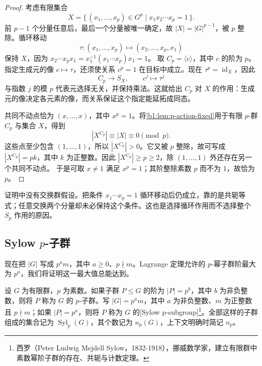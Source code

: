 \begin{proof}
	考虑有限集合
	\[
		X=\bigl\{\,(x_1,\ldots,x_p)\in G^p\mid x_1x_2\cdots x_p=1\,\bigr\}.
	\]
	前 \(p-1\) 个分量任意后，最后一个分量被唯一确定，故 \(|X|=|G|^{p-1}\)，被 \(p\) 整除。循环移动
	\[
		\tau:(x_1,\ldots,x_p)\longmapsto(x_2,\ldots,x_p,x_1)
	\]
	保持 \(X\)，因为 \(x_2\cdots x_px_1=x_1^{-1}(x_1\cdots x_p)x_1=1\)。 取 \(C_p=\langle c\rangle\)，其中 \(c\) 的阶为 \(p\)。指定生成元的像 \(c\mapsto\tau\)，还须使关系 \(c^p=1\) 在目标中成立。现在 \(\tau^p=\operatorname{id}_X\)，因此
	\[
		C_p\longrightarrow S_X,\qquad c^j\longmapsto\tau^j
	\]
	与指数 \(j\) 的模 \(p\) 代表元选择无关，并保持乘法。这就给出 \(C_p\) 对 \(X\) 的作用：生成元的像决定各元素的像，而关系保证这个指定能延拓成同态。

	共同不动点恰为 \((x,\ldots,x)\)，其中 \(x^p=1\)。将\cref{b1:lem:p-action-fixed}用于有限 \(p\)-群 \(C_p\) 与集合 \(X\)，得到
	\[
		|X^{C_p}|\equiv|X|\equiv0\pmod p.
	\]
	这些点至少包含 \((1,\ldots,1)\)，所以 \(|X^{C_p}|>0\)。它又被 \(p\) 整除，故可写成 \(|X^{C_p}|=pk\)，其中 \(k\) 为正整数。因此 \(|X^{C_p}|\geq p\geq2\)，除 \((1,\ldots,1)\) 外还存在另一个共同不动点。 于是可取 \(x\neq1\) 满足 \(x^p=1\)；其阶整除素数 \(p\) 而不为 \(1\)，故恰为 \(p\)。
\end{proof}

证明中没有交换群假设。把条件 \(x_1\cdots x_p=1\) 循环移动后仍成立，靠的是共轭等式；任意交换两个分量却未必保持这个条件。这也是选择循环作用而不选择整个 \(S_p\) 作用的原因。

\subsection{Sylow \texorpdfstring{\(p\)}{p}-子群}
\label{b1:subsec:0501:02}

现在把 \(|G|\) 写成 \(p^am\)，其中 \(a\geq0\)、\(p\nmid m\)。Lagrange 定理允许的 \(p\)-幂子群阶最大为 \(p^a\)，我们将证明这一最大值总能达到。

\begin{definition}\label{b1:def:sylow-subgroup}
	设 \(G\) 为有限群，\(p\) 为素数。如果子群 \(P\leq G\) 的阶为 \(|P|=p^b\)，其中 \(b\) 为非负整数，则将 \(P\) 称为 \(G\) 的 \(p\)-子群。写 \(|G|=p^am\)，其中 \(a\) 为非负整数、\(m\) 为正整数且 \(p\nmid m\)；如果 \(|P|=p^a\)，则将 \(P\) 称为 \(G\) 的[Sylow p-subgroup]\footnote{西罗（Peter Ludwig Mejdell Sylow，1832-1918），挪威数学家，建立有限群中素数幂阶子群的存在、共轭与计数定理。}。全部这样的子群组成的集合记为 \(\operatorname{Syl}_p(G)\)，其个数记为 \(n_p(G)\)，上下文明确时简记 \(n_p\)。
\end{definition}

